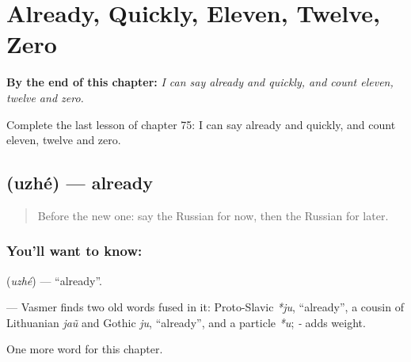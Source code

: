 
\chapter{Already, Quickly, Eleven, Twelve, Zero}
\label{ch:ru-already-quickly-eleven-twelve-zero}

\begin{chapteropening}
\textbf{By the end of this chapter:} \emph{I can say already and quickly, and count eleven, twelve and zero.}

Complete the last lesson of chapter 75: I can say already and quickly, and count eleven, twelve and zero.
\end{chapteropening}

\section[\texorpdfstring{\ru{уже} (uzhé)}{уже (uzhé)}]{ (uzhé) — already}

\label{lesson:RU-C75-already}



\begin{quote}
Before the new one: say the Russian for now, then the Russian for later.
\end{quote}

\subsection*{You'll want to know: }
\textbf{} (\emph{uzhé}) — \textquotedblleft{}already\textquotedblright{}.

\begin{cousinweb}
\textbf{} — Vasmer finds two old words fused in it: Proto-Slavic \emph{*ju}, \textquotedblleft{}already\textquotedblright{}, a cousin of Lithuanian \emph{jaũ} and Gothic \emph{ju}, \textquotedblleft{}already\textquotedblright{}, and a particle \emph{*u}; \emph{-} adds weight.
\end{cousinweb}

\begin{grammarlens}[title={What you've built}]
One more word for this chapter.
\end{grammarlens}

